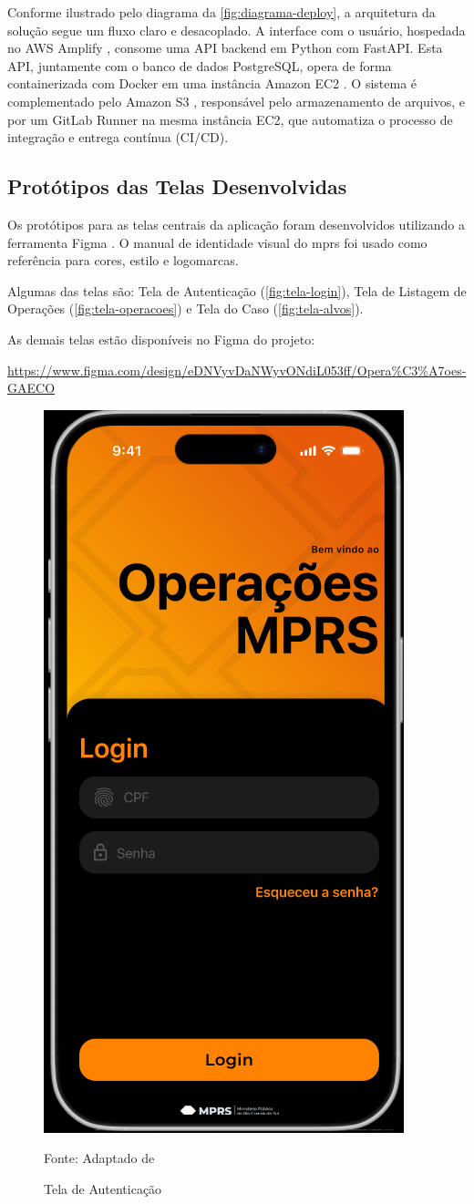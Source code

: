   Conforme ilustrado pelo diagrama da \autoref{fig:diagrama-deploy}, a arquitetura da solução segue um fluxo claro e desacoplado. A interface com o usuário, hospedada no AWS Amplify \cite{amplify}, consome uma API backend em Python \cite{python} com FastAPI. Esta API, juntamente com o banco de dados PostgreSQL, opera de forma containerizada com Docker \cite{docker} em uma instância Amazon EC2 \cite{ec2}. O sistema é complementado pelo Amazon S3 \cite{s3}, responsável pelo armazenamento de arquivos, e por um GitLab Runner \cite{gitlabrunner} na mesma instância EC2, que automatiza o processo de integração e entrega contínua (CI/CD).

\subsection{Protótipos das Telas Desenvolvidas}
  Os protótipos para as telas centrais da aplicação foram desenvolvidos utilizando a ferramenta Figma \cite{figma}. O manual de identidade visual do \acs{mprs} foi usado como referência para cores, estilo e logomarcas. 
  
  Algumas das telas são: Tela de Autenticação (\autoref{fig:tela-login}), Tela de Listagem de Operações (\autoref{fig:tela-operacoes}) e Tela do Caso (\autoref{fig:tela-alvos}).

  As demais telas estão disponíveis no Figma do projeto:
  
  \url{https://www.figma.com/design/eDNVyvDaNWyvONdiL053ff/Opera%C3%A7oes-GAECO}

  \begin{figure}[H]
    \centering
    \small
    \includegraphics[width=0.4\linewidth]{conteudo//2 - ages I//conteudo//figures//tela-login.png}
    \caption{Tela de Autenticação}
    Fonte: Adaptado de \textcites{figma-Operacoes GAECO}
    \label{fig:tela-login}
  \end{figure}

